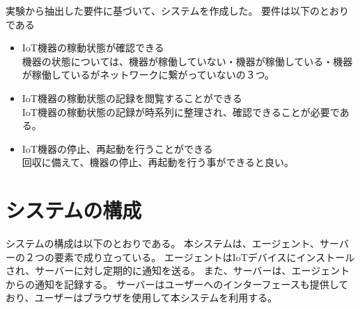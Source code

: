 実験から抽出した要件に基づいて、システムを作成した。
要件は以下のとおりである
\begin{itemize}
	\item IoT機器の稼動状態が確認できる\\
		機器の状態については、機器が稼働していない・機器が稼働している・機器が稼働しているがネットワークに繋がっていないの３つ。
	\item IoT機器の稼動状態の記録を閲覧することができる\\
		IoT機器の稼動状態の記録が時系列に整理され、確認できることが必要である。
	\item IoT機器の停止、再起動を行うことができる\\
		回収に備えて、機器の停止、再起動を行う事ができると良い。
\end{itemize}

\section{システムの構成}
システムの構成は以下のとおりである。
本システムは、エージェント、サーバーの２つの要素で成り立っている。
エージェントはIoTデバイスにインストールされ、サーバーに対し定期的に通知を送る。
また、サーバーは、エージェントからの通知を記録する。
サーバーはユーザーへのインターフェースも提供しており、ユーザーはブラウザを使用して本システムを利用する。


